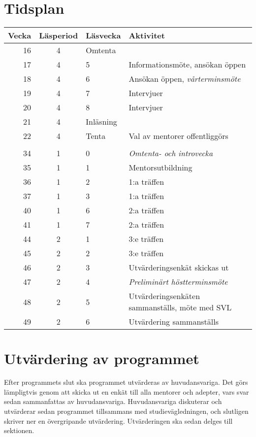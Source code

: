 \documentclass[10pt]{article}
\begin{document}
    \section{Tidsplan}
    \begin{tabularx}{\textwidth}{rclX}
        \textbf{Vecka} & \textbf{Läsperiod} & \textbf{Läsvecka} & \textbf{Aktivitet} \\
        \hline
        16 & 4 & Omtenta & \\
        17 & 4 & 5 & Informationsmöte, ansökan öppen \\
        18 & 4 & 6 & Ansökan öppen, \emph{vårterminsmöte} \\
        19 & 4 & 7 & Intervjuer \\
        20 & 4 & 8 & Intervjuer \\
        21 & 4 & Inläsning & \\
        22 & 4 & Tenta & Val av mentorer offentliggörs \\
        \\
        34 & 1 & 0 & \emph{Omtenta- och introvecka} \\
        35 & 1 & 1 & Mentorsutbildning \\
        36 & 1 & 2 & 1:a träffen \\
        37 & 1 & 3 & 1:a träffen \\
        40 & 1 & 6 & 2:a träffen \\
        41 & 1 & 7 & 2:a träffen \\
        44 & 2 & 1 & 3:e träffen \\
        45 & 2 & 2 & 3:e träffen \\
        46 & 2 & 3 & Utvärderingsenkät skickas ut \\
        47 & 2 & 4 & \emph{Preliminärt höstterminsmöte} \\
        48 & 2 & 5 & Utvärderingsenkäten sammanställs, möte med SVL \\
        49 & 2 & 6 & Utvärdering sammanställs \\
    \end{tabularx}

    \newpage

    \section{Utvärdering av programmet}
    Efter programmets slut ska programmet utvärderas av huvudansvariga.
    Det görs lämpligtvis genom att skicka ut en enkät till alla mentorer och adepter, vars svar sedan sammanfattas av huvudansvariga.
    Huvudansvariga diskuterar och utvärderar sedan programmet tillsammans med studievägledningen, och slutligen skriver ner en övergripande utvärdering.
    Utvärderingen ska sedan delges till sektionen.
\end{document}
